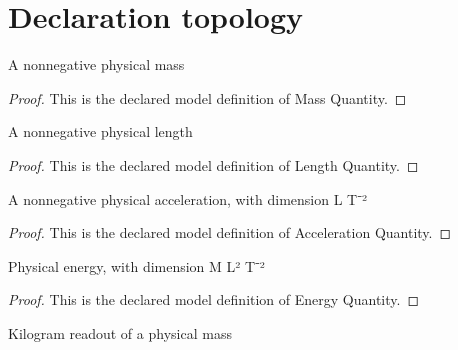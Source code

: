 \section{Declaration topology}
\begin{definition}
  \label{def:physics:phyx-mini-0274:phyxminiproblems-problemphyxmini0274-massquantity}
  A nonnegative physical mass
\end{definition}
\begin{proof}
  This is the declared model definition of Mass Quantity.
\end{proof}
\begin{definition}
  \label{def:physics:phyx-mini-0274:phyxminiproblems-problemphyxmini0274-lengthquantity}
  A nonnegative physical length
\end{definition}
\begin{proof}
  This is the declared model definition of Length Quantity.
\end{proof}
\begin{definition}
  \label{def:physics:phyx-mini-0274:phyxminiproblems-problemphyxmini0274-accelerationquantity}
  A nonnegative physical acceleration, with dimension L T⁻²
\end{definition}
\begin{proof}
  This is the declared model definition of Acceleration Quantity.
\end{proof}
\begin{definition}
  \label{def:physics:phyx-mini-0274:phyxminiproblems-problemphyxmini0274-energyquantity}
  Physical energy, with dimension M L² T⁻²
\end{definition}
\begin{proof}
  This is the declared model definition of Energy Quantity.
\end{proof}
\begin{definition}
  \label{def:physics:phyx-mini-0274:phyxminiproblems-problemphyxmini0274-massinkilograms}
  Kilogram readout of a physical mass
\end{definition}
